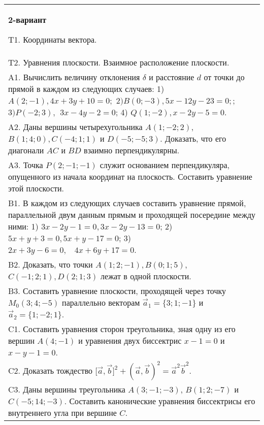 \documentclass{article}
\begin{document}
\begin{tabular}{m{17cm}}
\textbf{2-вариант}
\newline

T1. 
Координаты вектора.
 \\
T2. 
Уравнения плоскости. Взаимное расположение плоскости.
 \\
A1. 
Вычислить величину отклонения \(\delta\) и расстояние \(d\) от точки до прямой в каждом из следующих случаев: 1) \(A(2; - 1),4x + 3y + 10 = 0;\) \(2)B(0; - 3),5x - 12y - 23 = 0;\); \(3)P( - 2;3),\ \ 3x - 4y - 2 = 0\); 4) \(Q(1; - 2),x - 2y - 5 = 0\).
 \\
A2. 
Даны вершины четырехугольника \(A(1; - 2;2)\), \(B(1;4;0),C( - 4;1;1)\) и \(D( - 5; - 5;3)\). Доказать, что его диагонали \(AC\) и \(BD\) взаимно перпендикулярны.
 \\
A3. 
Точка \(P(2; - 1; - 1)\) служит основанием перпендикуляра, опущенного из начала координат на плоскость. Составить уравнение этой плоскости.
 \\
B1. 
В каждом из следующих случаев составить уравнение прямой, параллельной двум данным прямым и проходящей посередине между ними: 1)  \(3x - 2y - 1 = 0,3x - 2y - 13 = 0\); 2)  \(5x + y + 3 = 0,5x + y - 17 = 0\); 3)  \(2x + 3y - 6 = 0,\ \ \ \ 4x + 6y + 17 = 0\).
 \\
B2. 
Доказать, что точки \(A(1;2; - 1),B(0;1;5)\), \(C( - 1;2;1),D(2;1;3)\) лежат в одной плоскости.
 \\
B3. Составить уравнение плоскости, проходящей через точку \(M_{0}(3;4; - 5)\) параллельно векторам \({\overrightarrow{a}}_{1} = \{ 3;1; - 1\}\) и \({\overrightarrow{a}}_{2} = \{ 1; - 2;1\}\).
 \\
C1. 
Составить уравнения сторон треугольника, зная одну из его вершин \(A(4; - 1)\) и уравнения двух биссектрис \(x - 1 = 0\) и \(x - y - 1 = 0\).
 \\
C2. 
Доказать тождество \(\lbrack\overrightarrow{a},\overrightarrow{b}\rbrack^{2} + (\overrightarrow{a},\overrightarrow{b})^{2} = {\overrightarrow{a}}^{2}{\overrightarrow{b}}^{2}\).
 \\
C3. 
Даны вершины треугольника \(A(3; - 1; - 3)\), \(B(1;2; - 7)\) и \(C( - 5;14; - 3)\). Составить канонические уравнения биссектрисы его внутреннего угла при вершине \(C\).
 \\

\end{tabular}
\vspace{1cm}
\end{document}
